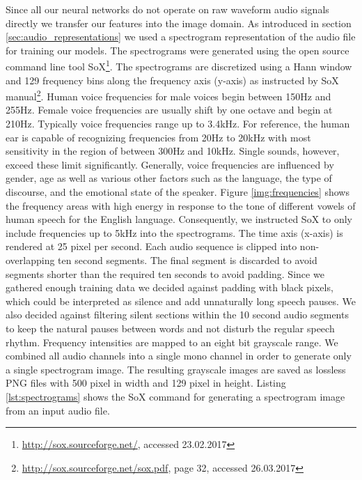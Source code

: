 	Since all our neural networks do not operate on raw waveform audio signals directly we transfer our features into the image domain. As introduced in section \ref{sec:audio_representations} we used a spectrogram representation of the audio file for training our models. The spectrograms were generated using the open source command line tool SoX\footnote{\url{http://sox.sourceforge.net/}, accessed 23.02.2017}. The spectrograms are discretized using a Hann window\cite{blackman1958measurement} and 129 frequency bins along the frequency axis (y-axis) as instructed by SoX manual\footnote{\url{http://sox.sourceforge.net/sox.pdf}, page 32, accessed 26.03.2017}. Human voice frequencies for male voices begin between 150Hz and 255Hz\cite{traunmuller1993frequency}. Female voice frequencies are usually shift by one octave and begin at 210Hz. Typically voice frequencies range up to 3.4kHz. For reference, the human ear is capable of recognizing frequencies from 20Hz to 20kHz with most sensitivity in the region of between 300Hz and 10kHz. Single sounds, however, exceed these limit significantly. Generally, voice frequencies are influenced by gender, age as well as various other factors such as the language, the type of discourse, and the emotional state of the speaker. Figure \ref{img:frequencies} shows the frequency areas with high energy in response to the tone of different vowels of human speech for the English language. Consequently, we instructed SoX to only include frequencies up to 5kHz into the spectrograms. The time axis (x-axis) is rendered at 25 pixel per second. Each audio sequence is clipped into non-overlapping ten second segments. The final segment is discarded to avoid segments shorter than the required ten seconds to avoid padding. Since we gathered enough training data we decided against padding with black pixels, which could be interpreted as silence and add unnaturally long speech pauses. We also decided against filtering silent sections within the 10 second audio segments to keep the natural pauses between words and not disturb the regular speech rhythm. Frequency intensities are mapped to an eight bit grayscale range. We combined all audio channels into a single mono channel in order to generate only a single spectrogram image. The resulting grayscale images are saved as lossless PNG files with 500 pixel in width and 129 pixel in height. Listing \ref{lst:spectrograms} shows the SoX command for generating a spectrogram image from an input audio file.
	
